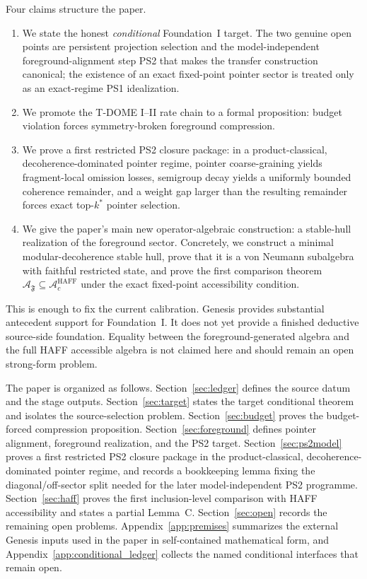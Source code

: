 \documentclass[12pt]{article}
\theoremstyle{definition}
\theoremstyle{remark}
\begin{document}
Four claims structure the paper.
\begin{enumerate}
\item We state the honest \emph{conditional} Foundation~I target. The
  two genuine open points are persistent projection selection and the
  model-independent foreground-alignment step PS2 that makes the
  transfer construction canonical; the existence of an exact fixed-point
  pointer sector is treated only as an exact-regime PS1 idealization.
\item We promote the T-DOME I--II rate chain to a formal proposition:
  budget violation forces symmetry-broken foreground compression.
\item We prove a first restricted PS2 closure package: in a
  product-classical, decoherence-dominated pointer regime, pointer
  coarse-graining yields fragment-local omission losses, semigroup decay
  yields a uniformly bounded coherence remainder, and a weight gap
  larger than the resulting remainder forces exact top-\(k^*\) pointer
  selection.
\item We give the paper's main new operator-algebraic construction: a
  stable-hull realization of the foreground sector. Concretely, we
  construct a minimal modular-decoherence stable hull, prove that it is
  a von Neumann subalgebra with faithful restricted state, and prove the
  first comparison theorem
  \(\mathcal A_{\mathfrak F}\subseteq
  \mathcal A_c^{\mathrm{HAFF}}\) under the exact fixed-point
  accessibility condition.
\end{enumerate}

This is enough to fix the current calibration. Genesis provides
substantial antecedent support for Foundation~I. It does not yet
provide a finished deductive source-side foundation. Equality between the
foreground-generated algebra and the full HAFF accessible algebra is not
claimed here and should remain an open strong-form problem.

The paper is organized as follows. Section~\ref{sec:ledger} defines the
source datum and the stage outputs. Section~\ref{sec:target} states the
target conditional theorem and isolates the source-selection problem.
Section~\ref{sec:budget} proves the budget-forced compression
proposition. Section~\ref{sec:foreground} defines pointer alignment,
foreground realization, and the PS2 target. Section~\ref{sec:ps2model}
proves a first restricted PS2 closure package in the
product-classical, decoherence-dominated pointer regime, and records a
bookkeeping lemma fixing the diagonal/off-sector split needed for the
later model-independent PS2 programme.
Section~\ref{sec:haff} proves the first inclusion-level comparison with
HAFF accessibility and states a partial Lemma~C.
Section~\ref{sec:open} records the remaining open problems.
Appendix~\ref{app:premises} summarizes the external Genesis inputs used
in the paper in self-contained mathematical form, and
Appendix~\ref{app:conditional_ledger} collects the
named conditional interfaces that remain open.
\end{document}
